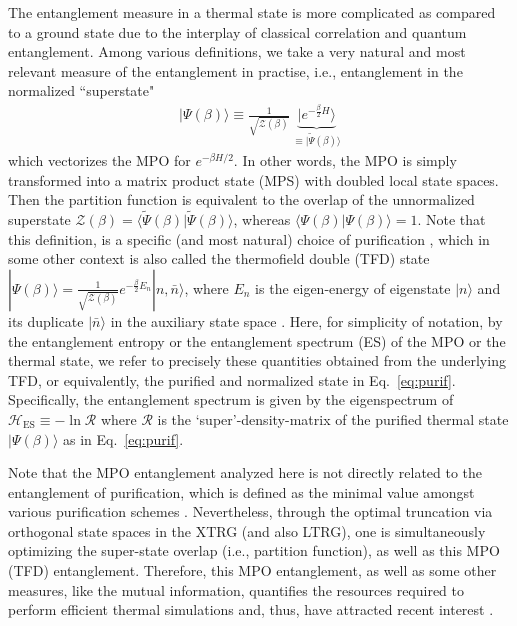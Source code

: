 \documentclass[aps,prx,twocolumn,showpacs,psfig,superscriptaddress,longbibliography]{revtex4-1}
\newcommand{\Eq}[1]{Eq.~\eqref{#1}}
\begin{document}
The entanglement measure in a thermal state is more complicated as
compared to a ground state due to the interplay of classical
correlation and quantum entanglement. Among various definitions, we
take a very natural and most relevant measure of the entanglement in
practise, i.e., entanglement in the  normalized ``superstate"
\cite{Zwolak.m+:2004:Superoperator}
%
\begin{eqnarray}
   |\Psi(\beta) \rangle \equiv
   \tfrac{1}{\sqrt{\mathcal{Z}(\beta)}} \,
   \underset{\equiv |\tilde{\Psi}(\beta) \rangle}
   {\underbrace{|e^{-\frac{\beta}{2} H}\rangle}}
\label{eq:purif}
\end{eqnarray}
%
which vectorizes the MPO for $e^{-\beta H/2}$.  In other
words, the MPO is simply transformed into a matrix product state
(MPS) with doubled local state spaces.  Then the partition function
is equivalent to the overlap of the unnormalized superstate
$\mathcal{Z} (\beta) = \langle \tilde{\Psi}(\beta) |
\tilde{\Psi}(\beta) \rangle$, whereas $\langle \Psi(\beta) |
\Psi(\beta) \rangle=1$.
%
Note that this definition, is a specific (and most natural) choice
of purification \cite{Verstraete.f+:2004:2DRenormalization,
Feiguin.a.e+:2005:ftDMRG}, which in some other context is also
called the thermofield double (TFD) state $|\Psi(\beta) \rangle =
\frac{1}{\sqrt{\mathcal{Z(\beta)}}} e^{-\frac{\beta}{2} E_n}
|n,\bar{n}\rangle$, where $E_n$ is the eigen-energy of eigenstate
$|n \rangle$ and its duplicate $|\bar{n} \rangle$ in the auxiliary
state space \cite{Takahashi.y+:1996:TFD, Maldacena.j:2003:ads,
Kallin.a.b+:2011:Entanglement, Schwarz17}.  Here, for simplicity of
notation, by the entanglement entropy or the entanglement spectrum
(ES) of the MPO or the thermal state, we refer to precisely these
quantities obtained from the underlying TFD, or equivalently, the
purified and normalized state in \Eq{eq:purif}.  Specifically, the
entanglement spectrum is given by the eigenspectrum of
$\mathcal{H}_\mathrm{ES} \equiv -\ln \mathcal{R}$ where
$\mathcal{R}$ is the `super'-density-matrix of the purified thermal
state $|\Psi(\beta) \rangle$ as in \Eq{eq:purif}.
 
Note that the MPO entanglement analyzed here is not directly related
to the entanglement of purification, which is defined as the minimal
value amongst various purification schemes
\cite{Terhal.b.m+:2002:Entanglement, Hauschild17}.  Nevertheless,
through the optimal truncation via orthogonal state spaces in the
XTRG (and also LTRG), one is simultaneously optimizing the
super-state overlap (i.e., partition function), as well as this MPO
(TFD) entanglement.  Therefore, this MPO entanglement, as well as
some other measures, like the mutual information, quantifies the
resources required to perform efficient thermal simulations  {and, thus,} have
attracted recent interest \cite{Nguyen.p+:2017:Entanglement,
Takayanagi.t+:2017:Holographic, Barthel.t:2017:FiniteT}. 
\end{document}
